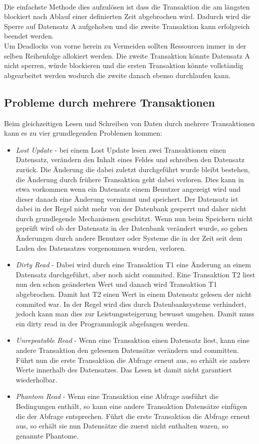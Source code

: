 \\Die einfachste Methode dies aufzulösen ist dass die Transaktion die am längsten blockiert nach Ablauf einer definierten Zeit abgebrochen wird. Dadurch wird die Sperre auf Datensatz A aufgehoben und die zweite Transaktion kann erfolgreich beendet werden.\parencite[S. 139ff]{WeikumVossen02}
\\Um Deadlocks von vorne herein zu Vermeiden sollten Ressourcen immer in der selben Reihenfolge allokiert werden. Die zweite Transaktion könnte Datensatz A nicht sperren, würde blockieren und die ersten Transaktion könnte vollständig abgearbeitet werden wodurch die zweite danach ebenso durchlaufen kann.


\subsection{Probleme durch mehrere Transaktionen}\label{subs:isolation}
Beim gleichzeitigen Lesen und Schreiben von Daten durch mehrere Transaktionen kann es zu vier grundlegenden Problemen kommen:
\begin{itemize}
	\item \emph{Lost Update} - bei einem Lost Update lesen zwei Transaktionen einen Datensatz, verändern den Inhalt eines Feldes und schreiben den Datensatz zurück. Die Änderung die dabei zuletzt durchgeführt wurde bleibt bestehen, die Änderung durch frühere Transaktion geht dabei verloren. Dies kann in etwa vorkommen wenn ein Datensatz einem Benutzer angezeigt wird und dieser danach eine Änderung vornimmt und speichert. Der Datensatz ist dabei in der Regel nicht mehr von der Datenbank gesperrt und daher nicht durch grundlegende Mechanismen geschützt. Wenn nun beim Speichern nicht geprüft wird ob der Datensatz in der Datenbank verändert wurde, so gehen Änderungen durch andere Benutzer oder Systeme die in der Zeit seit dem Laden des Datensatzes vorgenommen wurden, verloren.\parencite[S. 415f]{dbgrund}
	\item \emph{Dirty Read} - Dabei wird durch eine Transaktion T1 eine Änderung an einem Datensatz durchgeführt, aber noch nicht commited. Eine Transaktion T2 liest nun den schon geänderten Wert und danach wird Transaktion T1 abgebrochen. Damit hat T2 einen Wert in einem Datensatz gelesen der nicht commited war. In der Regel wird dies durch Datenbanksysteme verhindert, jedoch kann man dies zur Leistungssteigerung bewusst umgehen. Damit muss ein dirty read in der Programmlogik abgefangen werden.\parencite[S. 439]{dbgrund}
	\item \emph{Unrepeatable Read} - Wenn eine Transaktion einen Datensatz liest, kann eine andere Transaktion den gelesenen Datensätze verändern und committen. Führt nun die erste Transaktion die Abfrage erneut aus, so erhält sie andere Werte innerhalb des Datensatzes. Das Lesen ist damit nicht garantiert wiederholbar.\parencite[S. 439]{dbgrund}
	\item \emph{Phantom Read} - Wenn eine Transaktion eine Abfrage ausführt die Bedingungen enthält, so kann eine andere Transaktion Datensätze einfügen die der Abfrage entsprechen. Führt die erste Transaktion die Abfrage erneut aus, so erhält sie nun Datensätze die zuerst nicht enthalten waren, so genannte Phantome.\parencite[S. 439]{dbgrund}	
\end{itemize}
